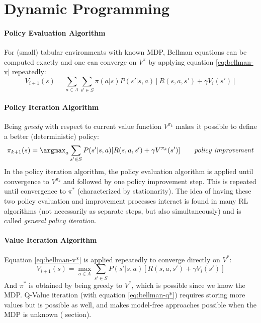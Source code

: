 \section{Dynamic Programming}
\label{section:dp}

\paragraph{Policy Evaluation Algorithm}
For (small) tabular environments with known MDP, Bellman equations can be computed exactly and one can converge on $V^{\pi}$ by applying equation \ref{eq:bellman-v} repeatedly:
\[
    V_{i+1}(s) = \sum_{a\in A} \sum_{s' \in S} \pi(a|s) P(s'|s,a) [R(s,a,s') + \gamma V_i(s')]
\]

\paragraph{Policy Iteration Algorithm}
Being \emph{greedy} with respect to current value function $V^{\pi_k}$ makes it possible to define a better (deterministic) policy: 
\[
    \pi_{k+1}(s) = \argmax_a \sum_{s' \in S} P(s'|s,a) [R(s,a,s') + \gamma V^{\pi_k}(s')] \tag*{\emph{policy improvement}}
\]
In the policy iteration algorithm, the policy evaluation algorithm is applied until convergence to $V^{\pi_k}$ and followed by one policy improvement step. This is repeated until convergence to $\pi^*$ (characterized by stationarity). The idea of having these two policy evaluation and improvement processes interact is found in many RL algorithms (not necessarily as separate steps, but also simultaneously) and is called \emph{general policy iteration}.

\paragraph{Value Iteration Algorithm}
Equation \ref{eq:bellman-v*} is applied repeatedly to converge directly on $V^*$:
\[
    V_{i+1}(s) = \max_{a\in A} \sum_{s' \in S} P(s'|s,a) [R(s,a,s') + \gamma V_i(s')]
\]
And $\pi^*$ is obtained by being greedy to $V^*$, which is possible since we know the MDP. Q-Value iteration (with equation \ref{eq:bellman-q*}) requires storing more values but is possible as well, and makes model-free approaches possible when the MDP is unknown ( section).